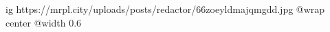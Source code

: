  
 
 
 
 

\ifcmt
  ig https://mrpl.city/uploads/posts/redactor/66zoeyldmajqmgdd.jpg
  @wrap center
  @width 0.6
\fi
